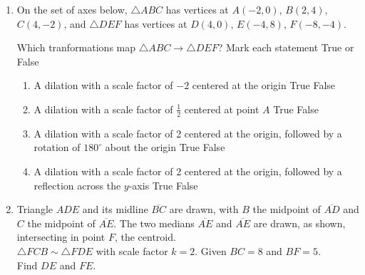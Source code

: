 \documentclass[12pt, twoside]{article}
\begin{document}
\begin{enumerate}
\item On the set of axes below, $\triangle ABC$ has vertices at $A(-2,0)$, $B(2,4)$, $C(4,-2)$, and $\triangle DEF$ has vertices at $D(4,0)$, $E(-4,8)$, $F(-8,-4)$.
\begin{center}
\end{center}
Which tranformations map $\triangle ABC \rightarrow \triangle DEF$? Mark each statement True or False
  \begin{enumerate}
    \item A dilation with a scale factor of $-2$ centered at the origin \hfill True \quad False
    \item A dilation with a scale factor of $\frac{1}{2}$ centered at point $A$ \hfill True \quad False
    \item A dilation with a scale factor of 2 centered at the origin, followed by a rotation of $180^\circ$ about the origin \hfill True \quad False
    \item A dilation with a scale factor of 2 centered at the origin, followed by a reflection across the $y$-axis \hfill True \quad False
  \end{enumerate}

\newpage 
\item Triangle $ADE$ and its midline $\overline{BC}$ are drawn, with $B$ the midpoint of $\overline{AD}$ and $C$ the midpoint of $\overline{AE}$. The two medians $\overline{AE}$ and $\overline{AE}$ are drawn, as shown, intersecting in point $F$, the centroid.\\[0.25cm]
$\triangle FCB \sim \triangle FDE$ with scale factor $k=2$. 
Given $BC=8$ and $BF=5$. \\[0.25cm] Find $DE$ and $FE$.
\begin{flushright}
  \end{flushright}


\end{enumerate}
\end{document}
